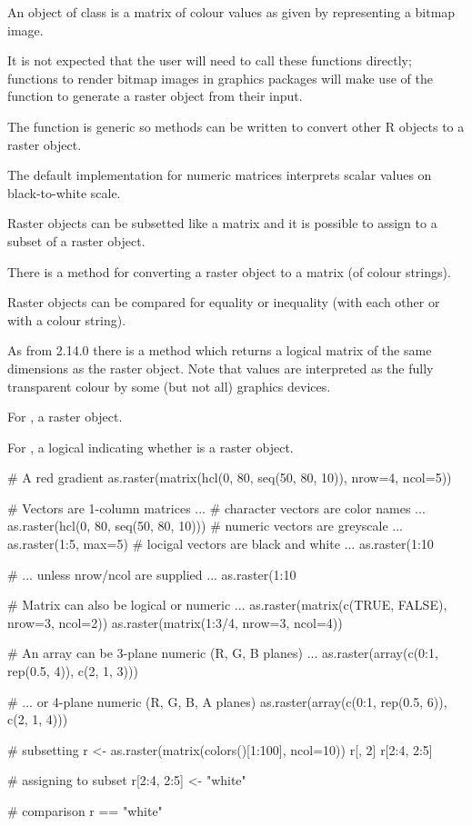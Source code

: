 \begin{Details}\relax
An object of class  is a matrix of colour values as
given by  representing a bitmap image.

It is not expected that the user will need to call these functions
directly; functions to render bitmap images in graphics packages will
make use of the  function to generate a raster
object from their input.

The  function is generic so methods can be
written to convert other R objects to a raster object.

The default implementation for numeric matrices interprets scalar
values on black-to-white scale.

Raster objects can be subsetted like a matrix and it is
possible to assign to a subset of a raster object.

There is a method for converting a raster object to a matrix
(of colour strings).

Raster objects can be compared
for equality or inequality (with each other or with a
colour string).

As from \R{} 2.14.0 there is a  method which returns
a logical matrix of the same dimensions as the raster object.  Note
that  values are interpreted as the fully transparent colour
by some (but not all) graphics devices.
\end{Details}
%
\begin{Value}
For , a raster object.

For , a logical indicating whether
 is a raster object.
\end{Value}
%
\begin{Examples}
\begin{ExampleCode}
# A red gradient
as.raster(matrix(hcl(0, 80, seq(50, 80, 10)),
                 nrow=4, ncol=5))

# Vectors are 1-column matrices ...
#   character vectors are color names ...
as.raster(hcl(0, 80, seq(50, 80, 10)))
#   numeric vectors are greyscale ...
as.raster(1:5, max=5)
#   locigal vectors are black and white ...
as.raster(1:10 %

# ... unless nrow/ncol are supplied ...
as.raster(1:10 %

# Matrix can also be logical or numeric ...
as.raster(matrix(c(TRUE, FALSE), nrow=3, ncol=2))
as.raster(matrix(1:3/4, nrow=3, ncol=4))

# An array can be 3-plane numeric (R, G, B planes) ...
as.raster(array(c(0:1, rep(0.5, 4)), c(2, 1, 3)))

# ... or 4-plane numeric (R, G, B, A planes)
as.raster(array(c(0:1, rep(0.5, 6)), c(2, 1, 4)))

# subsetting
r <- as.raster(matrix(colors()[1:100], ncol=10))
r[, 2]
r[2:4, 2:5]

# assigning to subset
r[2:4, 2:5] <- "white"

# comparison
r == "white"


\end{ExampleCode}
\end{Examples}

